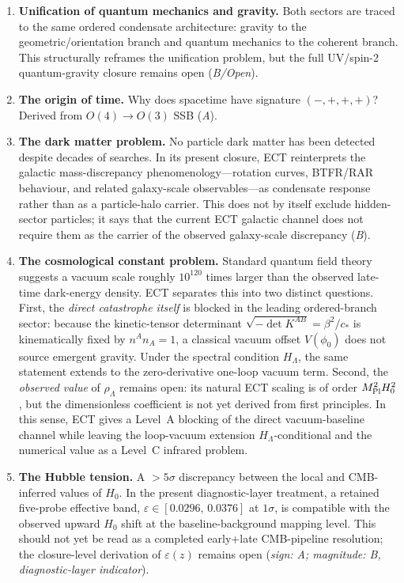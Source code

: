 \documentclass[11pt,a4paper]{article}
\begin{document}
\begin{enumerate}
\item \textbf{Unification of quantum mechanics and gravity.} Both sectors are traced to the same ordered condensate architecture: gravity to the geometric/orientation branch and quantum mechanics to the coherent branch. This structurally reframes the unification problem, but the full UV/spin-2 quantum-gravity closure remains open (\emph{B/Open}).

\item \textbf{The origin of time.} Why does spacetime have signature $(-,+,+,+)$? Derived from $O(4)\to O(3)$ SSB (\emph{A}).

\item \textbf{The dark matter problem.} No particle dark matter has been detected despite decades of searches. In its present closure, ECT reinterprets the galactic mass-discrepancy phenomenology---rotation curves, BTFR/RAR behaviour, and related galaxy-scale observables---as condensate response rather than as a particle-halo carrier. This does not by itself exclude hidden-sector particles; it says that the current ECT galactic channel does not require them as the carrier of the observed galaxy-scale discrepancy (\emph{B}).

\item \textbf{The cosmological constant problem.} Standard quantum field theory suggests a vacuum scale roughly $10^{120}$ times larger than the observed late-time dark-energy density. ECT separates this into two distinct questions. First, the \emph{direct catastrophe itself} is blocked in the leading ordered-branch sector: because the kinetic-tensor determinant $\sqrt{-\det K^{AB}}=\beta^2/c_*$ is kinematically fixed by $n^A n_A=1$, a classical vacuum offset $V(\phi_0)$ does not source emergent gravity. Under the spectral condition $H_\Lambda$, the same statement extends to the zero-derivative one-loop vacuum term. Second, the \emph{observed value} of $\rho_\Lambda$ remains open: its natural ECT scaling is of order $M_{\rm Pl}^2 H_0^2$, but the dimensionless coefficient is not yet derived from first principles. In this sense, ECT gives a Level~A blocking of the direct vacuum-baseline channel while leaving the loop-vacuum extension $H_\Lambda$-conditional and the numerical value as a Level~C infrared problem.

\item \textbf{The Hubble tension.} A $>5\sigma$ discrepancy between the local and CMB-inferred values of $H_0$. In the present diagnostic-layer treatment, a retained five-probe effective band, $\varepsilon \in [0.0296,\,0.0376]$ at $1\sigma$, is compatible with the observed upward $H_0$ shift at the baseline-background mapping level. This should not yet be read as a completed early+late CMB-pipeline resolution; the closure-level derivation of $\varepsilon(z)$ remains open (\emph{sign: A; magnitude: B, diagnostic-layer indicator}).


\end{enumerate}
\end{document}
